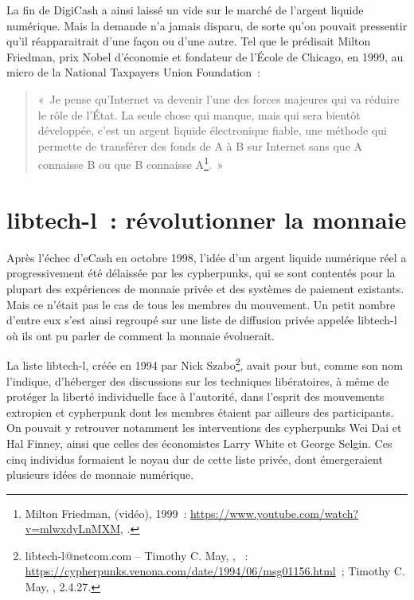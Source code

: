 La fin de DigiCash a ainsi laissé un vide sur le marché de l'argent liquide numérique. Mais la demande n'a jamais disparu, de sorte qu'on pouvait pressentir qu'il réapparaitrait d'une façon ou d'une autre. Tel que le prédisait Milton Friedman, prix Nobel d'économie et fondateur de l'École de Chicago, en 1999, au micro de la National Taxpayers Union Foundation~:

\begin{quote}
«~Je pense qu'Internet va devenir l'une des forces majeures qui va réduire le rôle de l'État. La seule chose qui manque, mais qui sera bientôt développée, c'est un argent liquide électronique fiable, une méthode qui permette de transférer des fonds de A à B sur Internet sans que A connaisse B ou que B connaisse A\footnote{Milton Friedman,  (vidéo), 1999~: \url{https://www.youtube.com/watch?v=mlwxdyLnMXM}, .}.~»
\end{quote} %

\section*{libtech-l~: révolutionner la monnaie}

Après l'échec d'eCash en octobre 1998, l'idée d'un argent liquide numérique réel a progressivement été délaissée par les cypherpunks, qui se sont contentés pour la plupart des expériences de monnaie privée et des systèmes de paiement existants. Mais ce n'était pas le cas de tous les membres du mouvement. Un petit nombre d'entre eux s'est ainsi regroupé sur une liste de diffusion privée appelée libtech-l où ils ont pu parler de comment la monnaie évoluerait.

La liste libtech-l, créée en 1994 par Nick Szabo\footnote{libtech-l@netcom.com -- Timothy C. May, , ~: \url{https://cypherpunks.venona.com/date/1994/06/msg01156.html}~; Timothy C. May, , 2.4.27.}, avait pour but, comme son nom l'indique, d'héberger des discussions sur les techniques libératoires, à même de protéger la liberté individuelle face à l'autorité, dans l'esprit des mouvements extropien et cypherpunk dont les membres étaient par ailleurs des participants. On pouvait y retrouver notamment les interventions des cypherpunks Wei Dai et Hal Finney, ainsi que celles des économistes Larry White et George Selgin. Ces cinq individus formaient le noyau dur de cette liste privée, dont émergeraient plusieurs idées de monnaie numérique.

